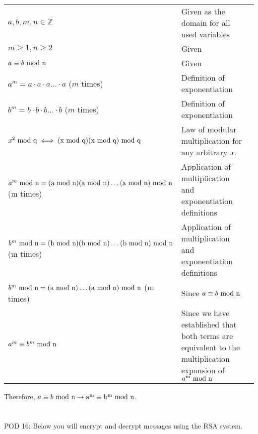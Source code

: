 \documentclass{article}
\begin{document}
\begin{center}
\begin{tabular}{p{0.6\linewidth}p{0.4\linewidth}c}
    $a,b,m,n \in \mathbb{Z}$ & Given as the domain for all used variables \\
    $m \geq 1, n \geq 2$ & Given \\
    $a \equiv b ~\rm{mod}~ n$ & Given \\
    $a^m = a \cdot a \cdot a\ldots \cdot a$ ($m$ times) & Definition of exponentiation \\
    $b^m = b \cdot b \cdot b\ldots \cdot b$ ($m$ times) & Definition of exponentiation \\
    $x^2 ~\rm{mod}~ q \iff (x ~\rm{mod}~ q)(x ~\rm{mod}~ q) ~\rm{mod}~ q$ & Law of modular multiplication for any arbitrary $x$. \\
    $a^m ~\rm{mod}~ n = (a ~\rm{mod}~ n)(a ~\rm{mod}~ n)\ldots (a ~\rm{mod}~ n) ~\rm{mod}~ n $ (m times) & Application of multiplication and exponentiation definitions \\
    $b^m ~\rm{mod}~ n = (b ~\rm{mod}~ n)(b ~\rm{mod}~ n)\ldots (b ~\rm{mod}~ n) ~\rm{mod}~ n $ (m times) & Application of multiplication and exponentiation definitions \\
    $b^m ~\rm{mod}~ n = (a ~\rm{mod}~ n)\ldots (a ~\rm{mod}~ n) ~\rm{mod}~ n $ (m times) & Since $a \equiv b ~\rm{mod}~ n$ \\
    $a^m \equiv b^m ~\rm{mod}~ n$ & Since we have established that both terms are equivalent to the multiplication expansion of $a^m ~\rm{mod}~ n$
\end{tabular}
\end{center}

Therefore, $a \equiv b ~\rm{mod}~ n \rightarrow a^m \equiv b^m ~\rm{mod}~ n$.

\newpage
\section{} %


\newpage
\section{} %
POD 16: Below you will encrypt and decrypt messages using the RSA system.

\end{document}
